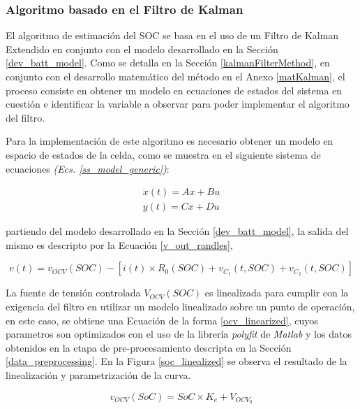\documentclass[10pt,a4paper]{article}
\newcounter{subsubsubsection}[subsubsection]
\begin{document}
\subsubsection{Algoritmo basado en el Filtro de Kalman}

El algoritmo de estimaci\'on del \acrshort{SOC} se basa en el uso 
de un Filtro de Kalman Extendido en conjunto con el modelo desarrollado en la 
Secci\'on \ref{dev_batt_model}. Como se detalla en la Secci\'on
\ref{kalmanFilterMethod}, en conjunto con el desarrollo matem\'atico del
m\'etodo en el Anexo \ref{matKalman}, el proceso consiste en obtener un modelo
en ecuaciones de estados del sistema en cuesti\'on e identificar la variable a 
observar para poder implementar el algoritmo del filtro.


Para la implementaci\'on de este algoritmo es necesario obtener un modelo en
espacio de estados de la celda, como se muestra en el siguiente sistema de
ecuaciones \emph{(Ecs. \ref{ss_model_generic})}:

\begin{align}
    \dot{x}(t) = Ax+Bu	\nonumber\\
    y(t)=Cx+Du
    \label{ss_model_generic}	
\end{align}

partiendo del modelo desarrollado en la Secci\'on \ref{dev_batt_model}, la
salida del mismo es descripto por la Ecuaci\'on \ref{v_out_randles},

\begin{equation}
    v(t) = v_{OCV}(SOC) - \left[i(t) \times R_0\left(SOC\right)  + v_{C_1}\left(t,
    SOC\right) + v_{C_2}\left(t, SOC\right)\right] \label{v_out_randles}
\end{equation}

\noindent La fuente de tensión controlada $V_{OCV}(SOC)$ es linealizada para 
cumplir con la exigencia del filtro en utilizar un modelo linealizado sobre un
punto de operaci\'on, en este caso, se obtiene una Ecuaci\'on de la forma
\ref{ocv_linearized}, cuyos parametros son optimizados con el uso de la
librer\'ia \emph{polyfit} de \emph{Matlab} y los datos obtenidos en la etapa de
pre-procesamiento descripta en la Secci\'on \ref{data_preprocessing}. En la 
Figura \ref{soc_linealized} se observa el resultado de la linealizaci\'on y
parametrizaci\'on de la curva.

\begin{equation}
    v_{OCV}(SoC) = SoC \times K_e + V_{OCV_0} 
    \label{ocv_linearized}
\end{equation}
\end{document}
